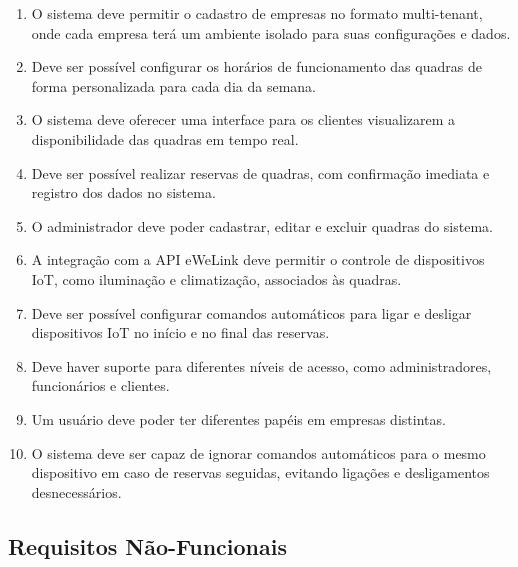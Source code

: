 \begin{enumerate}
     \item O sistema deve permitir o cadastro de empresas no formato multi-tenant, onde cada empresa terá um ambiente isolado para suas configurações e dados.
     \item Deve ser possível configurar os horários de funcionamento das quadras de forma personalizada para cada dia da semana.
     \item O sistema deve oferecer uma interface para os clientes visualizarem a disponibilidade das quadras em tempo real.
     \item Deve ser possível realizar reservas de quadras, com confirmação imediata e registro dos dados no sistema.
     \item O administrador deve poder cadastrar, editar e excluir quadras do sistema.
     \item A integração com a API eWeLink deve permitir o controle de dispositivos IoT, como iluminação e climatização, associados às quadras.
     \item Deve ser possível configurar comandos automáticos para ligar e desligar dispositivos IoT no início e no final das reservas.
     \item Deve haver suporte para diferentes níveis de acesso, como administradores, funcionários e clientes.
     \item Um usuário deve poder ter diferentes papéis em empresas distintas.
     \item O sistema deve ser capaz de ignorar comandos automáticos para o mesmo dispositivo em caso de reservas seguidas, evitando ligações e desligamentos desnecessários.
\end{enumerate}


\subsection{Requisitos Não-Funcionais}\label{subsec:requisitos_nao_funcionais}

